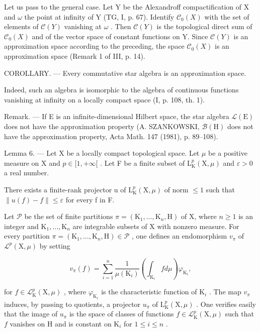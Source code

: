 Let us pass to the general case. Let Y be the Alexandroff compactification of X and \(\omega\) the point at infinity of Y (TG, I, p. 67). Identify \(\mathcal{C}_{0}(X)\) with the set of elements of \(\mathcal{C}(Y)\) vanishing at \(\omega\) . Then \(\mathcal{C}(Y)\) is the topological direct sum of \(\mathcal{C}_{0}(X)\) and of the vector space of constant functions on Y. Since \(\mathcal{C}(Y)\) is an approximation space according to the preceding, the space \(\mathcal{C}_{0}(X)\) is an approximation space (Remark 1 of III, p. 14).

COROLLARY. --- Every commutative star algebra is an approximation space.

Indeed, such an algebra is isomorphic to the algebra of continuous functions vanishing at infinity on a locally compact space (I, p. 108, th. 1).

Remark. --- If E is an infinite-dimensional Hilbert space, the star algebra \(\mathcal{L}(\mathrm{E})\) does not have the approximation property (A. SZANKOWSKI, \(\mathcal{B}(\mathrm{H})\) does not have the approximation property, Acta Math. 147 (1981), p. 89--108).

Lemma 6. --- Let X be a locally compact topological space. Let \(\mu\) be a positive measure on X and \(p \in [1, +\infty[\) . Let F be a finite subset of \(\mathrm{L}_{\mathrm{K}}^{p}(\mathrm{X}, \mu)\) and \(\varepsilon > 0\) a real number.

There exists a finite-rank projector u of \(\mathrm{L}_{\mathrm{K}}^{p}(\mathrm{X},\mu)\) of norm \(\leqslant 1\) such that \(\|u(f)-f\|\leqslant\varepsilon\) for every f in F.

Let \(\mathcal{P}\) be the set of finite partitions \(\pi = (\mathrm{K}_1, \ldots, \mathrm{K}_n, \mathrm{H})\) of X, where \(n \geqslant 1\) is an integer and \(\mathrm{K}_1, \ldots, \mathrm{K}_n\) are integrable subsets of X with nonzero measure. For every partition \(\pi = (\mathrm{K}_1, \ldots, \mathrm{K}_n, \mathrm{H}) \in \mathcal{P}\) , one defines an endomorphism \(v_\pi\) of \(\mathcal{L}^p(\mathrm{X}, \mu)\) by setting

\[
v _ {\pi} (f) = \sum_ {i = 1} ^ {n} \frac {1}{\mu (\mathrm{K} _ {i})} \left(\int_ {\mathrm{K} _ {i}} f d \mu\right) \varphi_ {\mathrm{K} _ {i}},
\]

for \(f \in \mathcal{L}_{\mathrm{K}}^{p}(\mathrm{X}, \mu)\) , where \(\varphi_{\mathrm{K}_i}\) is the characteristic function of \(\mathrm{K}_i\) . The map \(v_\pi\) induces, by passing to quotients, a projector \(u_\pi\) of \(\mathrm{L}_{\mathrm{K}}^{p}(\mathrm{X}, \mu)\) . One verifies easily that the image of \(u_\pi\) is the space of classes of functions \(f \in \mathcal{L}_{\mathrm{K}}^{p}(\mathrm{X}, \mu)\) such that \(f\) vanishes on H and is constant on \(\mathrm{K}_i\) for \(1 \leqslant i \leqslant n\) .

